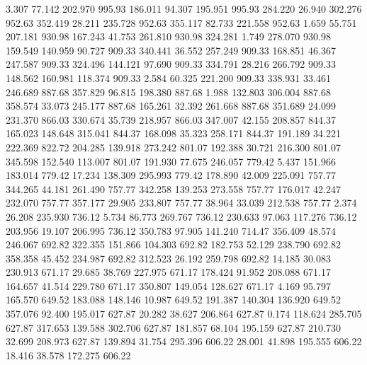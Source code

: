    3.307   77.142  202.970       995.93
 186.011   94.307  195.951       995.93
 284.220   26.940  302.276       952.63
 352.419   28.211  235.728       952.63
 355.117   82.733  221.558       952.63
   1.659   55.751  207.181       930.98
 167.243   41.753  261.810       930.98
 324.281    1.749  278.070       930.98
 159.549  140.959   90.727       909.33
 340.441   36.552  257.249       909.33
 168.851   46.367  247.587       909.33
 324.496  144.121   97.690       909.33
 334.791   28.216  266.792       909.33
 148.562  160.981  118.374       909.33
   2.584   60.325  221.200       909.33
 338.931   33.461  246.689       887.68
 357.829   96.815  198.380       887.68
   1.988  132.803  306.004       887.68
 358.574   33.073  245.177       887.68
 165.261   32.392  261.668       887.68
 351.689   24.099  231.370       866.03
 330.674   35.739  218.957       866.03
 347.007   42.155  208.857       844.37
 165.023  148.648  315.041       844.37
 168.098   35.323  258.171       844.37
 191.189   34.221  222.369       822.72
 204.285  139.918  273.242       801.07
 192.388   30.721  216.300       801.07
 345.598  152.540  113.007       801.07
 191.930   77.675  246.057       779.42
   5.437  151.966  183.014       779.42
  17.234  138.309  295.993       779.42
 178.890   42.009  225.091       757.77
 344.265   44.181  261.490       757.77
 342.258  139.253  273.558       757.77
 176.017   42.247  232.070       757.77
 357.177   29.905  233.807       757.77
  38.964   33.039  212.538       757.77
   2.374   26.208  235.930       736.12
   5.734   86.773  269.767       736.12
 230.633   97.063  117.276       736.12
 203.956   19.107  206.995       736.12
 350.783   97.905  141.240       714.47
 356.409   48.574  246.067       692.82
 322.355  151.866  104.303       692.82
 182.753   52.129  238.790       692.82
 358.358   45.452  234.987       692.82
 312.523   26.192  259.798       692.82
  14.185   30.083  230.913       671.17
  29.685   38.769  227.975       671.17
 178.424   91.952  208.088       671.17
 164.657   41.514  229.780       671.17
 350.807  149.054  128.627       671.17
   4.169   95.797  165.570       649.52
 183.088  148.146   10.987       649.52
 191.387  140.304  136.920       649.52
 357.076   92.400  195.017       627.87
  20.282   38.627  206.864       627.87
   0.174  118.624  285.705       627.87
 317.653  139.588  302.706       627.87
 181.857   68.104  195.159       627.87
 210.730   32.699  208.973       627.87
 139.894   31.754  295.396       606.22
  28.001   41.898  195.555       606.22
  18.416   38.578  172.275       606.22
